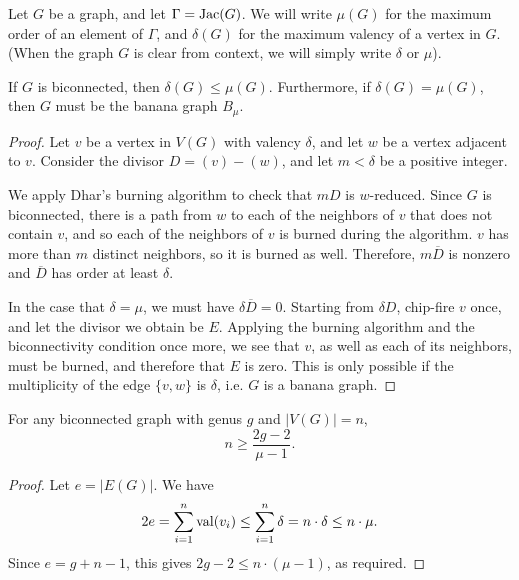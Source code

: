 \documentclass{amsart}
\begin{document}
\begin{defn}
  Let $G$ be a graph, and let $\Gamma = \operatorname{Jac}(G)$. We will write $\mu(G)$
  for the maximum order of an element of $\Gamma$, and $\delta(G)$ for
  the maximum valency of a vertex in $G$. (When the graph $G$ is clear
  from context, we will simply write $\delta$ or $\mu$). 
\end{defn}

\begin{lem}
  \label{lem:delta_le_mu}
  If $G$ is biconnected, then $\delta(G) \le \mu(G)$. Furthermore, if
  $\delta(G) = \mu(G)$, then $G$ must be the banana graph $B_\mu$.
\end{lem}
\begin{proof}
  Let $v$ be a vertex in $V(G)$ with valency $\delta$, and let $w$ be
  a vertex adjacent to $v$. Consider the divisor $D = (v) -
  (w)$, and let $m < \delta$ be a positive integer. 

  We apply Dhar's burning algorithm to check that $mD$ is
  $w$-reduced. Since $G$ is biconnected, there is a path from $w$ to
  each of the neighbors of $v$ that does not contain $v$, and so each
  of the neighbors of $v$ is burned during the algorithm. $v$ has more
  than $m$ distinct neighbors, so it is burned as well. Therefore,
  $m\overline{D}$ is nonzero and $\overline{D}$ has order at least
  $\delta$.

  In the case that $\delta = \mu$, we must have $\delta\overline{D} =
  0$. Starting from $\delta D$, chip-fire $v$ once, and let the divisor
  we obtain be $E$. Applying the burning algorithm and the
  biconnectivity condition once more, we see that $v$, as well as each
  of its neighbors, must be burned, and therefore that $E$ is
  zero. This is only possible if the multiplicity of the edge
  $\{v,w\}$ is $\delta$, i.e. $G$ is a banana graph.
\end{proof}

\begin{cor}
  \label{cor:genus_v_mu}
  For any biconnected graph with genus $g$ and $|V(G)| = n$,
  \begin{equation*}
    n \ge \frac{2g - 2}{\mu - 1}.
  \end{equation*}
\end{cor}
\begin{proof}
  Let $e = |E(G)|$. We have 
  \begin{equation*}
    2e = \sum_{i=1}^n \operatorname{val}(v_i) \le \sum_{i=1}^n \delta = n \cdot \delta
    \le n \cdot \mu.
  \end{equation*}
  Since $e = g + n - 1$, this gives $2g - 2 \le n \cdot (\mu - 1)$, as
  required.
\end{proof}
\end{document}

